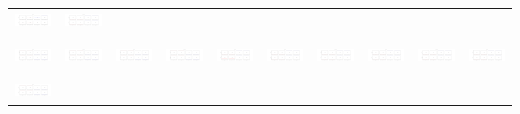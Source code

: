 \documentclass[]{article}
\begin{document}
\begin{table}[h]
\begin{tabular}{| c | c | c | c | c | c | c | c | c | c |}
		\includegraphics[width=0.09\linewidth]{0.60_0.80.png} &
		\includegraphics[width=0.09\linewidth]{0.60_0.90.png} \\
		& & & & & & & & & \\
		\hline
		& & & & & & & & & \\
		\includegraphics[width=0.09\linewidth]{0.70_0.00.png} &
		\includegraphics[width=0.09\linewidth]{0.70_0.10.png} &
		\includegraphics[width=0.09\linewidth]{0.70_0.20.png} &
		\includegraphics[width=0.09\linewidth]{0.70_0.30.png} &
		\includegraphics[width=0.09\linewidth]{0.70_0.40.png} &
		\includegraphics[width=0.09\linewidth]{0.70_0.50.png} &
		\includegraphics[width=0.09\linewidth]{0.70_0.60.png} &
		\includegraphics[width=0.09\linewidth]{0.70_0.70.png} &
		\includegraphics[width=0.09\linewidth]{0.70_0.80.png} &
		\includegraphics[width=0.09\linewidth]{0.70_0.90.png} \\
		& & & & & & & & & \\
		\hline
		& & & & & & & & & \\
		\includegraphics[width=0.09\linewidth]{0.80_0.00.png} &

\end{tabular}
\end{table}
\end{document}
